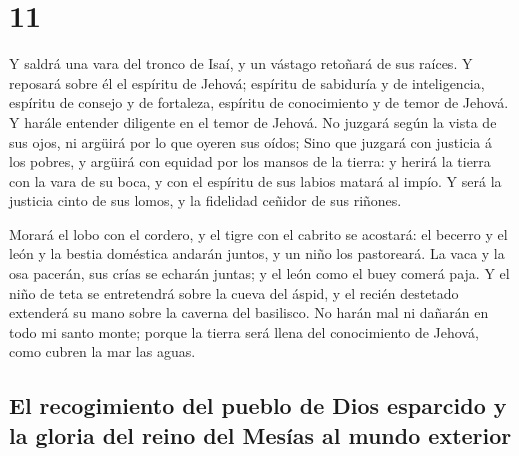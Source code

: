 \hypertarget{section-10}{%
\section{11}\label{section-10}}

 Y saldrá una vara del tronco de Isaí, y un vástago
retoñará de sus raíces.  Y reposará sobre él el espíritu
de Jehová; espíritu de sabiduría y de inteligencia, espíritu de consejo
y de fortaleza, espíritu de conocimiento y de temor de Jehová.
 Y harále entender diligente en el temor de Jehová. No
juzgará según la vista de sus ojos, ni argüirá por lo que oyeren sus
oídos;  Sino que juzgará con justicia á los pobres, y
argüirá con equidad por los mansos de la tierra: y herirá la tierra con
la vara de su boca, y con el espíritu de sus labios matará al impío.
 Y será la justicia cinto de sus lomos, y la fidelidad
ceñidor de sus riñones.

 Morará el lobo con el cordero, y el tigre con el cabrito
se acostará: el becerro y el león y la bestia doméstica andarán juntos,
y un niño los pastoreará.  La vaca y la osa pacerán, sus
crías se echarán juntas; y el león como el buey comerá paja.
 Y el niño de teta se entretendrá sobre la cueva del
áspid, y el recién destetado extenderá su mano sobre la caverna del
basilisco.  No harán mal ni dañarán en todo mi santo
monte; porque la tierra será llena del conocimiento de Jehová, como
cubren la mar las aguas.

\hypertarget{el-recogimiento-del-pueblo-de-dios-esparcido-y-la-gloria-del-reino-del-mesuxedas-al-mundo-exterior}{%
\subsection{El recogimiento del pueblo de Dios esparcido y la gloria del
reino del Mesías al mundo
exterior}\label{el-recogimiento-del-pueblo-de-dios-esparcido-y-la-gloria-del-reino-del-mesuxedas-al-mundo-exterior}}

